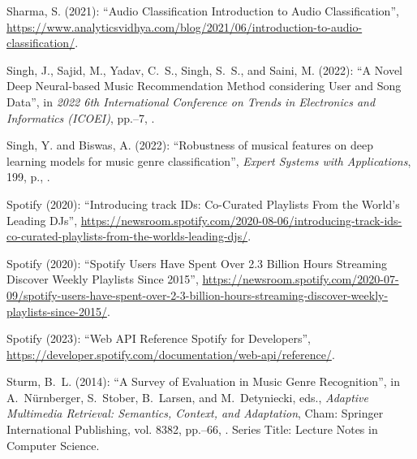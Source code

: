 \documentclass[11pt,titlepage,oneside]{book}
\begin{document}
\begin{thebibliography}{97}
	Sharma, S. (2021): \enquote{Audio {Classification} {\textbar} {Introduction} to
		{Audio} {Classification}},
	\urlprefix\url{https://www.analyticsvidhya.com/blog/2021/06/introduction-to-audio-classification/}.
	
	Singh, J., Sajid, M., Yadav, C.~S., Singh, S.~S., and Saini, M. (2022):
	\enquote{A {Novel} {Deep} {Neural}-based {Music} {Recommendation} {Method}
		considering {User} and {Song} {Data}}, in \textit{2022 6th {International}
		{Conference} on {Trends} in {Electronics} and {Informatics} ({ICOEI})},
	pp.--7, .
	
	Singh, Y. and Biswas, A. (2022): \enquote{Robustness of musical features on
		deep learning models for music genre classification}, \textit{Expert Systems
		with Applications}, 199, p.,
	.
	
	Spotify (2020{}): \enquote{Introducing track {IDs}: {Co}-{Curated}
		{Playlists} {From} the {World}’s {Leading} {DJs}},
	\urlprefix\url{https://newsroom.spotify.com/2020-08-06/introducing-track-ids-co-curated-playlists-from-the-worlds-leading-djs/}.
	
	Spotify (2020{}): \enquote{Spotify {Users} {Have} {Spent} {Over}
		2.3 {Billion} {Hours} {Streaming} {Discover} {Weekly} {Playlists} {Since}
		2015},
	\urlprefix\url{https://newsroom.spotify.com/2020-07-09/spotify-users-have-spent-over-2-3-billion-hours-streaming-discover-weekly-playlists-since-2015/}.
	
	Spotify (2023): \enquote{Web {API} {Reference} {\textbar} {Spotify} for
		{Developers}},
	\urlprefix\url{https://developer.spotify.com/documentation/web-api/reference/}.
	
	Sturm, B.~L. (2014): \enquote{A {Survey} of {Evaluation} in {Music} {Genre}
		{Recognition}}, in A.~Nürnberger, S.~Stober, B.~Larsen, and M.~Detyniecki,
	eds., \textit{Adaptive {Multimedia} {Retrieval}: {Semantics}, {Context}, and
		{Adaptation}}, Cham: Springer International Publishing, vol. 8382,
	pp.--66, . Series Title:
	Lecture Notes in Computer Science.
	

\end{thebibliography}
\end{document}
